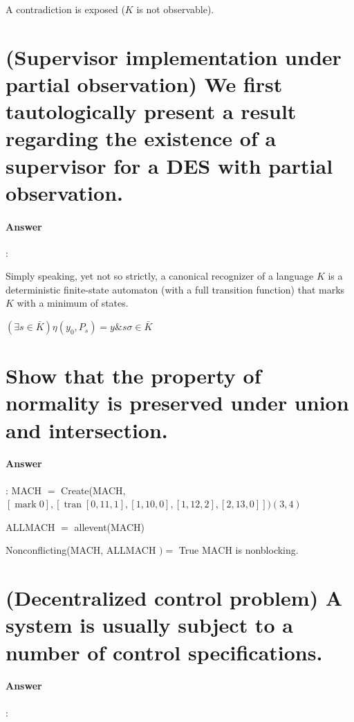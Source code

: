 \documentclass{article}
\begin{document}
A contradiction is exposed ($K$ is not observable).

\section{(Supervisor implementation under partial observation) We first tautologically present a result regarding the existence of a supervisor for a DES with partial observation.}

\paragraph{Answer}:

Simply speaking, yet not so strictly, a canonical recognizer of a language $K$ is a deterministic finite-state automaton (with a full transition function) that marks $K$ with a minimum of states.

$(\exists s \in \bar{K})\eta(y_0, P_s) = y \& s\sigma \in \bar{K}$


\section{Show that the property of normality is preserved under union and intersection.}

\paragraph{Answer}:
MACH $=$ Create(MACH, $[\operatorname{mark} 0],[\operatorname{tran}[0,11,1],[1,10,0],[1,12,2],[2,13,0]])(3,4)$

ALLMACH $=$ allevent(MACH)

Nonconflicting(MACH, ALLMACH $)=$ True $\mathrm{MACH}$ is nonblocking.

\section{(Decentralized control problem) A system is usually subject to a number of control specifications.}

\paragraph{Answer}:
\end{document}
